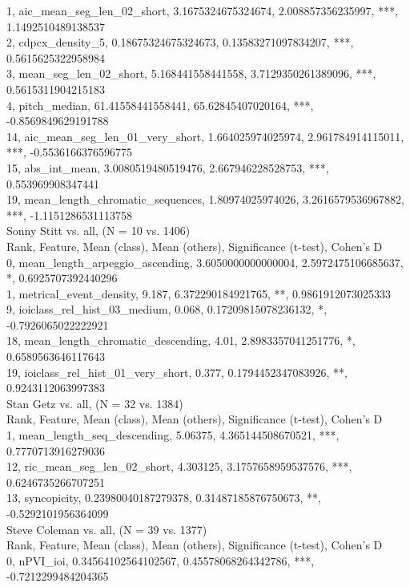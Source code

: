 1, aic_mean_seg_len_02_short, 3.1675324675324674, 2.008857356235997, ***, 1.1492510489138537\\
2, cdpcx_density_5, 0.18675324675324673, 0.13583271097834207, ***, 0.5615625322958984\\
3, mean_seg_len_02_short, 5.168441558441558, 3.7129350261389096, ***, 0.5615311904215183\\
4, pitch_median, 61.41558441558441, 65.62845407020164, ***, -0.8569849629191788\\
14, aic_mean_seg_len_01_very_short, 1.664025974025974, 2.961784914115011, ***, -0.5536166376596775\\
15, abs_int_mean, 3.0080519480519476, 2.667946228528753, ***, 0.553969908347441\\
19, mean_length_chromatic_sequences, 1.80974025974026, 3.2616579536967882, ***, -1.1151286531113758\\
Sonny Stitt vs. all, (N = 10 vs. 1406)\\
Rank, Feature, Mean (class), Mean (others), Significance (t-test), Cohen's D\\
0, mean_length_arpeggio_ascending, 3.6050000000000004, 2.5972475106685637, *, 0.6925707392440296\\
1, metrical_event_density, 9.187, 6.372290184921765, **, 0.9861912073025333\\
9, ioiclass_rel_hist_03_medium, 0.068, 0.17209815078236132, *, -0.7926065022222921\\
18, mean_length_chromatic_descending, 4.01, 2.8983357041251776, *, 0.6589563646117643\\
19, ioiclass_rel_hist_01_very_short, 0.377, 0.1794452347083926, **, 0.9243112063997383\\
Stan Getz vs. all, (N = 32 vs. 1384)\\
Rank, Feature, Mean (class), Mean (others), Significance (t-test), Cohen's D\\
1, mean_length_seq_descending, 5.06375, 4.365144508670521, ***, 0.7770713916279036\\
12, ric_mean_seg_len_02_short, 4.303125, 3.1757658959537576, ***, 0.6246735266707251\\
13, syncopicity, 0.23980040187279378, 0.31487185876750673, **, -0.5292101956364099\\
Steve Coleman vs. all, (N = 39 vs. 1377)\\
Rank, Feature, Mean (class), Mean (others), Significance (t-test), Cohen's D\\
0, nPVI_ioi, 0.34564102564102567, 0.45578068264342786, ***, -0.7212299484204365\\
